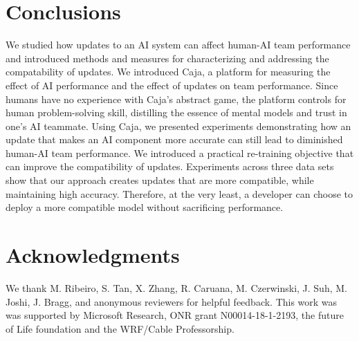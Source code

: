 \documentclass[letterpaper]{article}
\newcommand{\plat}{{\sc Caja}}
\begin{document}
\section{Conclusions}
    We studied how updates to an AI system can affect human-AI team performance and introduced methods and measures for characterizing and addressing the compatability of updates. We introduced \plat, a platform for measuring the effect of AI performance and the effect of updates on team performance. Since humans have no experience with \plat's abstract game, the platform controls for human problem-solving skill, distilling the essence of mental models and trust in one's AI teammate.
    Using \plat, we presented experiments  demonstrating how an update that makes an AI component more accurate can still lead to diminished human-AI team performance. %
    We introduced a practical re-training objective that can improve the compatibility of updates. 
    Experiments across three data sets show that our  approach creates updates that are more compatible, while maintaining high accuracy. 
    Therefore, at the very least, a developer can choose to deploy a more compatible model without sacrificing performance. 
    
    

\section{Acknowledgments}
We thank  M.  Ribeiro,  S.  Tan,  X.
Zhang,  R.  Caruana,  M.  Czerwinski,  J.  Suh,  M.  Joshi,  J.
Bragg, and anonymous reviewers for helpful feedback. This work was
was supported by Microsoft Research, ONR grant N00014-18-1-2193, the future of Life foundation and the WRF/Cable Professorship.



\end{document}

